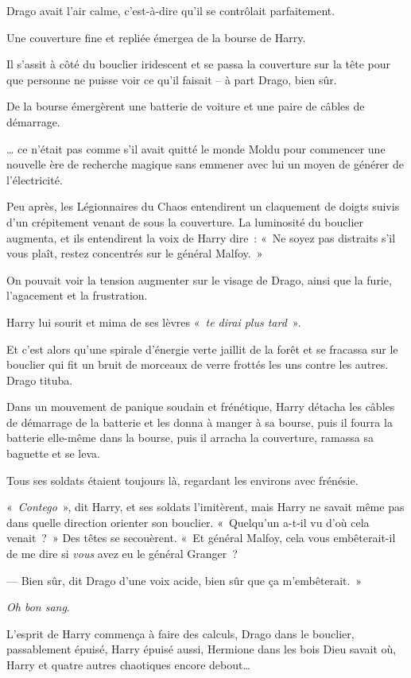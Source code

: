 Drago avait l'air calme, c'est-à-dire qu'il se contrôlait parfaitement.

Une couverture fine et repliée émergea de la bourse de Harry.

Il s'assit à côté du bouclier iridescent et se passa la couverture sur la tête pour que personne ne puisse voir ce qu'il faisait -- à part Drago, bien sûr.

De la bourse émergèrent une batterie de voiture et une paire de câbles de démarrage.

… ce n'était pas comme s'il avait quitté le monde Moldu pour commencer une nouvelle ère de recherche magique sans emmener avec lui un moyen de générer de l'électricité.

Peu après, les Légionnaires du Chaos entendirent un claquement de doigts suivis d'un crépitement venant de sous la couverture. La luminosité du bouclier augmenta, et ils entendirent la voix de Harry dire~: «~Ne soyez pas distraits s'il vous plaît, restez concentrés sur le général Malfoy.~»

On pouvait voir la tension augmenter sur le visage de Drago, ainsi que la furie, l'agacement et la frustration.

Harry lui sourit et mima de ses lèvres «~\emph{te dirai plus tard}~».

Et c'est alors qu'une spirale d'énergie verte jaillit de la forêt et se fracassa sur le bouclier qui fit un bruit de morceaux de verre frottés les uns contre les autres. Drago tituba.

Dans un mouvement de panique soudain et frénétique, Harry détacha les câbles de démarrage de la batterie et les donna à manger à sa bourse, puis il fourra la batterie elle-même dans la bourse, puis il arracha la couverture, ramassa sa baguette et se leva.

Tous ses soldats étaient toujours là, regardant les environs avec frénésie.

«~\emph{Contego}~», dit Harry, et ses soldats l'imitèrent, mais Harry ne savait même pas dans quelle direction orienter son bouclier. «~Quelqu'un a-t-il vu d'où cela venait~?~» Des têtes se secouèrent. «~Et général Malfoy, cela vous embêterait-il de me dire si \emph{vous} avez eu le général Granger~?

--- Bien sûr, dit Drago d'une voix acide, bien sûr que ça m'embêterait.~»

\emph{Oh bon sang}.

L'esprit de Harry commença à faire des calculs, Drago dans le bouclier, passablement épuisé, Harry épuisé aussi, Hermione dans les bois Dieu savait où, Harry et quatre autres chaotiques encore debout…

